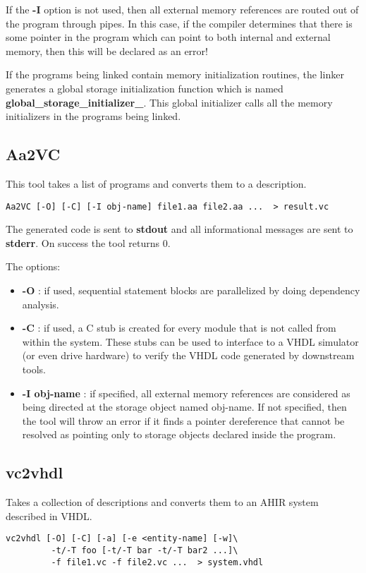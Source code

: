 If the {\bf -I} option is not used, then all external memory
references are routed out of the \Aa program through pipes.
In this case, if the \Aa compiler determines that there is some pointer 
in the program which can point
to both internal and external memory, then this will be
declared as an error!  

If the programs being linked contain memory initialization
routines, the linker generates a global storage initialization
function which is named {\bf global\_storage\_initializer\_}.
This global initializer calls all the memory initializers in
the programs being linked.

\subsection{{\bf Aa2VC}}

This tool takes a list of \Aa programs and converts them
to a \vC description. 
\begin{verbatim}
Aa2VC [-O] [-C] [-I obj-name] file1.aa file2.aa ...  > result.vc
\end{verbatim}
The generated \vC code is sent to {\bf stdout} and all informational
messages are sent to {\bf stderr}.  On success the tool returns 0.

The options:
\begin{itemize}
\item {\bf -O} : if used, sequential statement blocks are parallelized
by doing dependency analysis.
\item {\bf -C} : if used, a C stub is created for every module that
is not called from within the system.  These stubs can be used to
interface to a VHDL simulator (or even drive hardware) to verify
the VHDL code generated by downstream tools.
\item {\bf -I obj-name} : if specified, all external memory references
are considered as being directed at the storage object named obj-name.
If not specified, then the tool will throw an error if it finds
a pointer dereference that cannot be resolved as pointing only to
storage objects declared inside the \Aa program.
\end{itemize}

\subsection{\bf vc2vhdl}

Takes a collection of \vC descriptions and converts them to
an AHIR system described in VHDL.
\begin{verbatim}
vc2vhdl [-O] [-C] [-a] [-e <entity-name] [-w]\
         -t/-T foo [-t/-T bar -t/-T bar2 ...]\
         -f file1.vc -f file2.vc ...  > system.vhdl
\end{verbatim}

